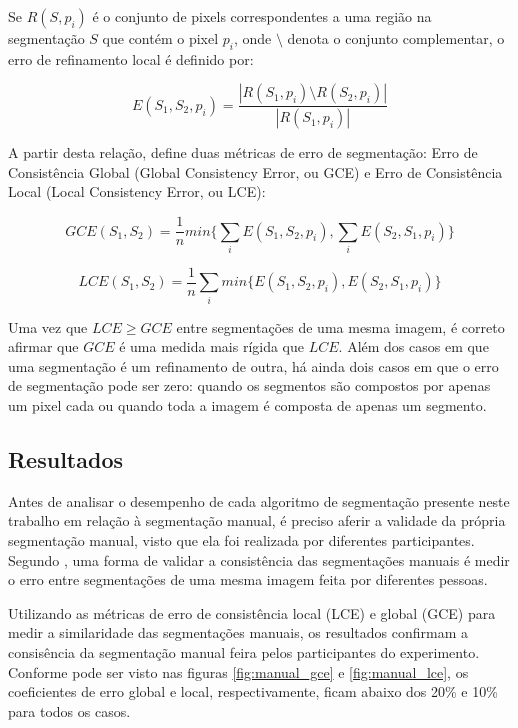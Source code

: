 Se $R(S,p_i)$ é o conjunto de pixels correspondentes a uma região na segmentação $S$ que contém o pixel $p_i$, onde $\setminus$ denota o conjunto complementar, o erro de refinamento local é definido por:

\begin{equation}
	E(S_1,S_2,p_i) = \frac{|R(S_1,p_i) \setminus R(S_2,p_i)|}{|R(S_1,p_i)|}
\end{equation}


A partir desta relação,  define duas métricas de erro de segmentação: Erro de Consistência Global (Global Consistency Error, ou GCE) e Erro de Consistência Local (Local Consistency Error, ou LCE):

\begin{equation}
	GCE(S_1,S_2) = \frac{1}{n} min \biggl\{ \sum_{i} E(S_1,S_2,p_i), \sum_{i} E(S_2,S_1,p_i) \biggr\}
\end{equation}

\begin{equation}
	LCE(S_1,S_2) = \frac{1}{n} \sum_{i} min \biggl\{ E(S_1,S_2,p_i), E(S_2,S_1,p_i) \biggr\}
\end{equation}

Uma vez que $LCE \geq GCE$ entre segmentações de uma mesma imagem, é correto afirmar que $GCE$ é uma medida mais rígida que $LCE$. Além dos casos em que uma segmentação é um refinamento de outra, há ainda dois casos em que o erro de segmentação pode ser zero: quando os segmentos são compostos por apenas um pixel cada ou quando toda a imagem é composta de apenas um segmento.

\subsection{Resultados}

Antes de analisar o desempenho de cada algoritmo de segmentação presente neste trabalho em relação à segmentação manual, é preciso aferir a validade da própria segmentação manual, visto que ela foi realizada por diferentes participantes. Segundo , uma forma de validar a consistência das segmentações manuais é medir o erro entre segmentações de uma mesma imagem feita por diferentes pessoas.

Utilizando as métricas de erro de consistência local (LCE) e global (GCE) para medir a similaridade das segmentações manuais, os resultados confirmam a consisência da segmentação manual feira pelos participantes do experimento. Conforme pode ser visto nas figuras \ref{fig:manual_gce} e \ref{fig:manual_lce}, os coeficientes de erro global e local, respectivamente, ficam abaixo dos 20\% e 10\% para todos os casos.

